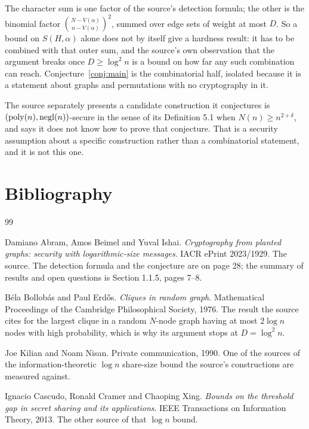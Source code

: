 \documentclass{aicr-conjecture}
\newcommand{\V}{V}
\begin{document}
\begin{remark}
The character sum is one factor of the source's detection formula; the
other is the binomial factor $\binom{N-\V(\alpha)}{n-\V(\alpha)}^{2}$,
summed over edge sets of weight at most $D$. So a bound on
$S(H,\alpha)$ alone does not by itself give a hardness result: it has to
be combined with that outer sum, and the source's own observation that
the argument breaks once $D \ge \log^{2} n$ is a bound on how far any such
combination can reach. Conjecture~\ref{conj:main} is the combinatorial
half, isolated because it is a statement about graphs and permutations
with no cryptography in it.
\end{remark}

\begin{remark}
The source separately presents a candidate construction it conjectures is
$(\mathrm{poly}(n), \mathrm{negl}(n))$-secure in the sense of its Definition 5.1
when $N(n) \ge n^{2+\delta}$, and says it does not know how to prove that
conjecture. That is a security assumption about a specific construction
rather than a combinatorial statement, and it is not this one.
\end{remark}

\section{Bibliography}

\begin{aicrbibliography}{99}

Damiano Abram, Amos Beimel and Yuval Ishai.
\emph{Cryptography from planted graphs: security with logarithmic-size
messages}.
IACR ePrint 2023/1929.
The source. The detection formula and the conjecture are on page 28; the
summary of results and open questions is Section 1.1.5, pages 7--8.

B\'ela Bollob\'as and Paul Erd\H{o}s.
\emph{Cliques in random graph}.
Mathematical Proceedings of the Cambridge Philosophical Society, 1976.
The result the source cites for the largest clique in a random $N$-node
graph having at most $2\log n$ nodes with high probability, which is why
its argument stops at $D = \log^{2} n$.

Joe Kilian and Noam Nisan.
Private communication, 1990.
One of the sources of the information-theoretic $\log n$ share-size bound
the source's constructions are measured against.

Ignacio Cascudo, Ronald Cramer and Chaoping Xing.
\emph{Bounds on the threshold gap in secret sharing and its
applications}.
IEEE Transactions on Information Theory, 2013.
The other source of that $\log n$ bound.

\end{aicrbibliography}
\end{document}
